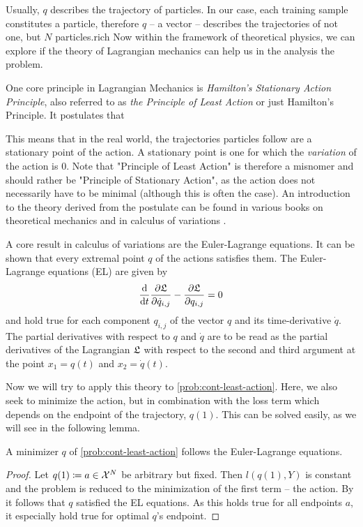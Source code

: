 Usually, $q$ describes the trajectory of particles.
In our case, each training sample constitutes a particle, therefore $q$ -- a vector -- describes the trajectories of not one, but $N$ particles.rich 
Now within the framework of theoretical physics, we can explore if the theory of Lagrangian mechanics can help us in the analysis the problem.

One core principle in Lagrangian Mechanics is \emph{Hamilton's Stationary Action Principle}, also referred to as \emph{the Principle of Least Action} or just Hamilton's Principle.
It postulates that\vspace{.5em}
\newline
{}

This means that in the real world, the trajectories particles follow are a stationary point of the action.
A stationary point is one for which the \emph{variation} of the action is $0$.
Note that "Principle of Least Action" is therefore a misnomer and should rather be "Principle of Stationary Action", as the action does not necessarily have to be minimal (although this is often the case).
An introduction to the theory derived from the postulate can be found in various books on theoretical mechanics \cite{goldstein01, marsden10, feynman63} and in calculus of variations \cite{kielhofer18}.

A core result in calculus of variations are the Euler-Lagrange equations.
It can be shown that every extremal point $q$ of the actions satisfies them.
The Euler-Lagrange equations (EL) are given by
\begin{equation}
\frac{\mathrm{d}}{\mathrm{d}t} \frac{\partial \mathfrak{L}}{\partial \dot{q}_{i, j}} - \frac{\partial \mathfrak{L}}{\partial q_{i, j}} = 0
\end{equation}
and hold true for each component $q_{i, j}$ of the vector $q$ and its time-derivative $\dot{q}$.
The partial derivatives with respect to $q$ and $\dot{q}$ are to be read as the partial derivatives of the Lagrangian $\mathfrak{L}$ with respect to the second and third argument at the point $x_1 = q(t)$ and $x_2 = \dot{q}(t)$.

Now we will try to apply this theory to \cref{prob:cont-least-action}.
Here, we also seek to minimize the action, but in combination with the loss term which depends on the endpoint of the trajectory, $q(1)$.
This can be solved easily, as we will see in the following lemma.
\begin{lemma}
	A minimizer $q$ of \cref{prob:cont-least-action} follows the Euler-Lagrange equations.
\end{lemma}
\begin{proof}
	Let $q(1) \coloneqq a \in \mathcal{X}^N$ be arbitrary but fixed.
	Then $l(q(1), Y)$ is constant and the problem is reduced to the minimization of the first term -- the action.
	By \cite[~Proposition 1.4.1]{kielhofer18} it follows that $q$ satisfied the EL equations.
	As this holds true for all endpoints $a$, it especially hold true for optimal $q$'s endpoint.
\end{proof}

